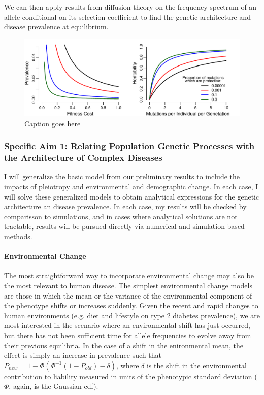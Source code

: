 \documentclass[11pt]{article}
\begin{document}
We can then apply results from diffusion theory on the frequency spectrum of an allele conditional on its selection coefficient \cite{Sawyer:1992vb, Bustamante:2001wi,Ewens2004} to find the genetic architecture and disease prevalence at equilibrium. 



  \begin{figure}
    \includegraphics[width=\textwidth]{../figures/SimpleModelSolutions.pdf}
    \caption{Caption goes here}
  \end{figure}
  



\subsubsection*{Specific Aim 1: Relating Population Genetic Processes with the Architecture of Complex Diseases}

I will generalize the basic model from our preliminary results to include the impacts of pleiotropy and environmental and demographic change. In each case, I will solve these generalized models to obtain analytical expressions for the genetic architecture an disease prevalence. In each case, my results will be checked by comparisson to simulations, and in cases where analytical solutions are not tractable, results will be pursued directly via numerical and simulation based methods.


\paragraph{Environmental Change} \qquad

The most straightforward way to incorporate environmental change may also be the most relevant to human disease. The simplest environmental change models are those in which the mean or the variance of the environmental component of the phenotype shifts or increases suddenly. Given the recent and rapid changes to human environments (e.g. diet and lifestyle on type 2 diabetes prevalence), we are most interested in the scenario where an environmental shift has just occurred, but there has not been sufficient time for allele frequencies to evolve away from their previous equilibria. In the case of a shift in the enironmental mean, the effect is simply an increase in prevalence such that $P_{new} = 1 - \Phi\left(\Phi^{-1}\left(1-P_{old}\right)-\delta\right)$, where $\delta$ is the shift in the environmental contribution to liability measured in units of the phenotypic standard deviation ($\Phi$, again, is the Gaussian cdf).
\end{document}
